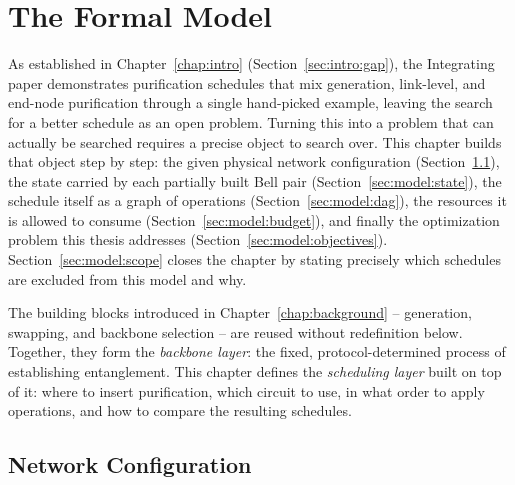 \chapter{The Formal Model}
\label{chap:model}


As established in Chapter~\ref{chap:intro} (Section~\ref{sec:intro:gap}), the Integrating paper \cite{Benchasattabuse2025Integrating} demonstrates purification schedules that mix generation, link-level, and end-node purification through a single hand-picked example, leaving the search for a better schedule as an open problem. Turning this into a problem that can actually be searched requires a precise object to search over. This chapter builds that object step by step: the given physical network configuration (Section~\ref{sec:model:network}), the state carried by each partially built Bell pair (Section~\ref{sec:model:state}), the schedule itself as a graph of operations (Section~\ref{sec:model:dag}), the resources it is allowed to consume (Section~\ref{sec:model:budget}), and finally the optimization problem this thesis addresses (Section~\ref{sec:model:objectives}). Section~\ref{sec:model:scope} closes the chapter by stating precisely which schedules are excluded from this model and why.

The building blocks introduced in Chapter~\ref{chap:background} -- generation, swapping, and backbone selection -- are reused without redefinition below. Together, they form the \emph{backbone layer}: the fixed, protocol-determined process of establishing entanglement. This chapter defines the \emph{scheduling layer} built on top of it: where to insert purification, which circuit to use, in what order to apply operations, and how to compare the resulting schedules.

\section{Network Configuration}
\label{sec:model:network}


